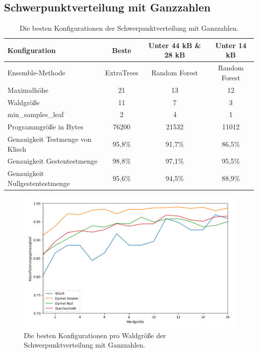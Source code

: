 \subsection{Schwerpunktverteilung mit Ganzzahlen}
\begin{table}[h!]
    \hspace{-0.5cm}
    \begin{tabular}{ | l | c | c | c |}
        \hline
        Konfiguration & Beste & Unter 44 kB \& 28 kB & Unter 14 kB \\\hline
        Ensemble-Methode & ExtraTrees & Random Forest & Random Forest \\\hline
        Maximalhöhe & 21 & 13 & 12 \\\hline
        Waldgröße & 11 & 7 & 3 \\\hline
        min\_samples\_leaf & 2 & 4 & 1 \\\hline
        Programmgröße in Bytes & 76200 & 21532 & 11012 \\\hline
        Genauigkeit Testmenge von Klisch & 95,8\% & 91,7\% & 86,5\% \\\hline
        Genauigkeit Gestentestmenge & 98,8\% & 97,1\% & 95,5\% \\\hline
        Genauigkeit Nullgestentestmenge & 95,6\% & 94,5\% & 88,9\% \\\hline
    \end{tabular}
    \caption{Die besten Konfigurationen der Schwerpunktverteilung mit Ganzzahlen.}
    \label{tab:schwerpunktverteilung_int}
\end{table}
\begin{figure}[h!]
    \centering
    \includegraphics[width=\linewidth]{images/cocd_int_acc_per_size.png}
    \caption{Die besten Konfigurationen pro Waldgröße der Schwerpunktverteilung mit Ganzzahlen.}
    \label{fig:cocd_int_per_forest_size}
\end{figure}
